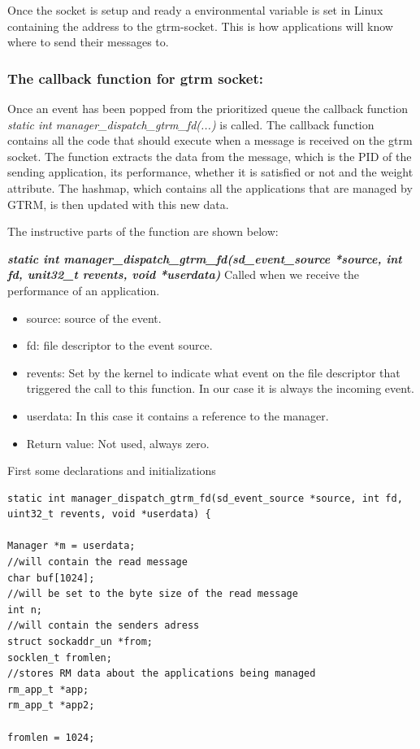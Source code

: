 \documentclass[nobiblatex]{LTHthesis}
\begin{document}
Once the socket is setup and ready a environmental variable is set in Linux containing the address to the gtrm-socket. This is how applications will know where to send their messages to.


\subsubsection{The callback function for gtrm socket:}
Once an event has been popped from the prioritized queue the callback function \emph{static int manager\_dispatch\_gtrm\_fd(...)} is called. 
The callback function contains all the code that should execute when a message is received on the gtrm socket. The function extracts the data from the message, which is the PID of the sending application, its performance, whether it is satisfied or not and the weight attribute. 
The hashmap, which contains all the applications that are managed by GTRM, is then updated with this new data. 




The instructive parts of the function are shown below:

\begin{framed}
		\begin{flushleft}
			\textbf{\emph{static int manager\_dispatch\_gtrm\_fd(sd\_event\_source *source, int fd, unit32\_t revents, void *userdata)}}\newline
				Called when we receive the performance of an application.
				\begin{itemize}
				\item source: source of the event.
				\item fd: file descriptor to the event source.
				\item revents: Set by the kernel to indicate what event on the file descriptor that triggered the call to this function. In our case it is always the incoming event.
				\item userdata: In this case it contains a reference to the manager.
				\item Return value: Not used, always zero.
				\end{itemize}
		\end{flushleft}	
\end{framed}





First some declarations and initializations

\begin{verbatim}
static int manager_dispatch_gtrm_fd(sd_event_source *source, int fd,
uint32_t revents, void *userdata) {

Manager *m = userdata;    		    
//will contain the read message
char buf[1024];
//will be set to the byte size of the read message
int n;
//will contain the senders adress
struct sockaddr_un *from;
socklen_t fromlen;
//stores RM data about the applications being managed
rm_app_t *app;
rm_app_t *app2;	

fromlen = 1024;
\end{verbatim}
\end{document}
